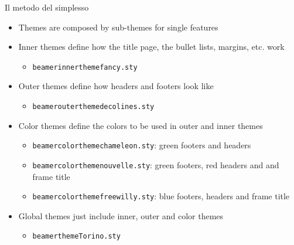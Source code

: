 \begin{frame}[t,fragile]{\textrm{Il metodo del simplesso}}
\begin{itemize}
\item Themes are composed by sub-themes for single features
\item Inner themes define how the title page, the bullet lists, margins,
      etc. work
  \begin{itemize}
    \item \verb!beamerinnerthemefancy.sty!
  \end{itemize}
\item Outer themes define how headers and footers look like
  \begin{itemize}
    \item \verb!beamerouterthemedecolines.sty!
  \end{itemize}
\item Color themes define the colors to be used in outer and inner themes
  \begin{itemize}
    \item \verb!beamercolorthemechameleon.sty!: green footers and headers
    \item \verb!beamercolorthemenouvelle.sty!: green footers, red headers and
          and frame title
    \item \verb!beamercolorthemefreewilly.sty!: blue footers, headers and
          frame title
  \end{itemize}
\item Global themes just include inner, outer and color themes
  \begin{itemize}
    \item \verb!beamerthemeTorino.sty!
  \end{itemize}
\end{itemize}
\end{frame}

